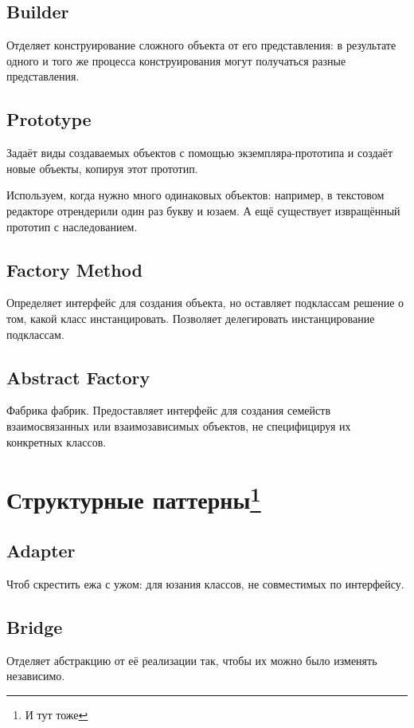 \documentclass[11pt,a4paper]{article}
\begin{document}
\subsection{Builder}
Отделяет конструирование сложного объекта от его представления: в результате одного и того же процесса конструирования могут получаться разные представления.

\subsection{Prototype}
Задаёт виды создаваемых объектов с помощью экземпляра-прототипа и создаёт новые объекты, копируя этот прототип.

Используем, когда нужно много одинаковых объектов: например, в текстовом редакторе отрендерили один раз букву и юзаем. А ещё существует извращённый прототип с наследованием.

\subsection{Factory Method}
Определяет интерфейс для создания объекта, но оставляет подклассам решение о том, какой класс инстанцировать. Позволяет делегировать инстанцирование подклассам.

\subsection{Abstract Factory}
Фабрика фабрик. Предоставляет интерфейс для создания семейств взаимосвязанных или взаимозависимых объектов, не специфицируя их конкретных классов.


\section{Структурные паттерны\footnote{И тут тоже}}
\subsection{Adapter}
Чтоб скрестить ежа с ужом: для юзания классов, не совместимых по интерфейсу.

\subsection{Bridge}
Отделяет абстракцию от её реализации так, чтобы их можно было изменять независимо.
\end{document}
